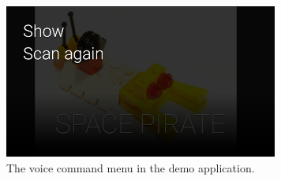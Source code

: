 	\begin{figure}[ht!]
		\centering
		\includegraphics[width=90mm]{images/demo/voiceCommand1}
		\caption{The voice command menu in the demo application.}
		\label{glassDemoVoiceCommand}
	\end{figure}


